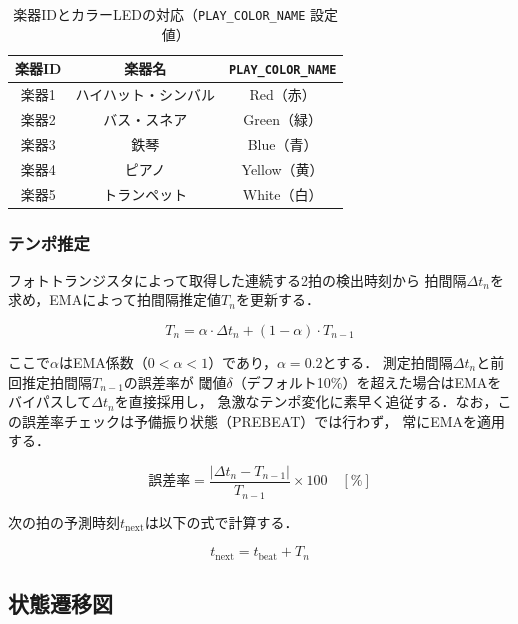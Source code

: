 \begin{table}[H]
\centering
\caption{楽器IDとカラーLEDの対応（\texttt{PLAY\_COLOR\_NAME} 設定値）}
\label{tab:color_map}
\begin{tabular}{ccc}
\hline
楽器ID & 楽器名 & \texttt{PLAY\_COLOR\_NAME} \\\hline
楽器1 & ハイハット・シンバル & Red（赤） \\
楽器2 & バス・スネア         & Green（緑） \\
楽器3 & 鉄琴                 & Blue（青） \\
楽器4 & ピアノ               & Yellow（黄） \\
楽器5 & トランペット         & White（白） \\\hline
\end{tabular}
\end{table}

\subsubsection*{テンポ推定}
フォトトランジスタによって取得した連続する2拍の検出時刻から
拍間隔$\Delta t_n$を求め，EMAによって拍間隔推定値$T_n$を更新する．

\begin{equation}
  T_n = \alpha \cdot \Delta t_n + (1 - \alpha) \cdot T_{n-1}
\end{equation}

ここで$\alpha$はEMA係数（$0 < \alpha < 1$）であり，$\alpha = 0.2$とする．
測定拍間隔$\Delta t_n$と前回推定拍間隔$T_{n-1}$の誤差率が
閾値$\delta$（デフォルト10\%）を超えた場合はEMAをバイパスして$\Delta t_n$を直接採用し，
急激なテンポ変化に素早く追従する．なお，この誤差率チェックは予備振り状態（PREBEAT）では行わず，
常にEMAを適用する．

\begin{equation}
  \text{誤差率} = \frac{|\Delta t_n - T_{n-1}|}{T_{n-1}} \times 100 \quad [\%]
\end{equation}

次の拍の予測時刻$t_{\text{next}}$は以下の式で計算する．

\begin{equation}
  t_{\text{next}} = t_{\text{beat}} + T_n
\end{equation}

\subsection{状態遷移図}

